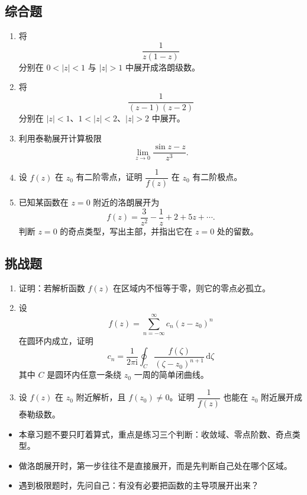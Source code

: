 \subsection*{综合题}

\begin{enumerate}
    \item 将
    \[
        \frac{1}{z(1-z)}
    \]
    分别在 $0<|z|<1$ 与 $|z|>1$ 中展开成洛朗级数。

    \item 将
    \[
        \frac{1}{(z-1)(z-2)}
    \]
    分别在 $|z|<1$、$1<|z|<2$、$|z|>2$ 中展开。

    \item 利用泰勒展开计算极限
    \[
        \lim_{z\to 0}\frac{\sin z-z}{z^3}.
    \]

    \item 设 $f(z)$ 在 $z_0$ 有二阶零点，证明 $\dfrac{1}{f(z)}$ 在 $z_0$ 有二阶极点。

    \item 已知某函数在 $z=0$ 附近的洛朗展开为
    \[
        f(z)=\frac{3}{z^2}-\frac{1}{z}+2+5z+\cdots.
    \]
    判断 $z=0$ 的奇点类型，写出主部，并指出它在 $z=0$ 处的留数。
\end{enumerate}

\subsection*{挑战题}

\begin{enumerate}
    \item 证明：若解析函数 $f(z)$ 在区域内不恒等于零，则它的零点必孤立。

    \item 设
    \[
        f(z)=\sum_{n=-\infty}^{\infty} c_n (z-z_0)^n
    \]
    在圆环内成立，证明
    \[
        c_n = \frac{1}{2\pi \mathrm{i}}\oint_C \frac{f(\zeta)}{(\zeta-z_0)^{n+1}}\,\mathrm{d}\zeta
    \]
    其中 $C$ 是圆环内任意一条绕 $z_0$ 一周的简单闭曲线。

    \item 设 $f(z)$ 在 $z_0$ 附近解析，且 $f(z_0)\ne 0$。证明 $\dfrac{1}{f(z)}$ 也能在 $z_0$ 附近展开成泰勒级数。
\end{enumerate}

\begin{tishi}[习题提示]
\begin{itemize}
    \item 本章习题不要只盯着算式，重点是练习三个判断：收敛域、零点阶数、奇点类型。
    \item 做洛朗展开时，第一步往往不是直接展开，而是先判断自己处在哪个区域。
    \item 遇到极限题时，先问自己：有没有必要把函数的主导项展开出来？
\end{itemize}
\end{tishi}
